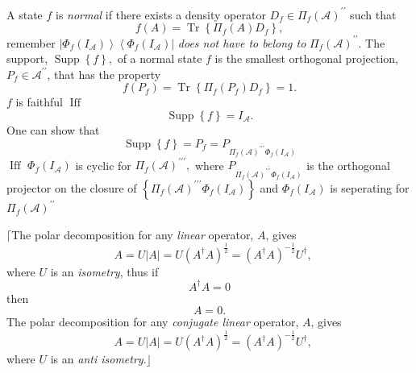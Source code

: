 \documentclass[aps,preprint]{revtex4}%
\begin{document}
A\emph{ }state $f$ is \emph{normal} if there exists a density operator
$D_{f}\in\Pi_{f}\left(  \mathcal{A}\right)  ^{\prime\prime}$ such that
\begin{equation}
f\left(  A\right)  =\operatorname{Tr}\left\{  \Pi_{f}\left(  A\right)
D_{f}\right\}  ,
\end{equation}
remember $\left\vert \Phi_{f}\left(  I_{\mathcal{A}}\right)  \right\rangle
\left\langle \Phi_{f}\left(  I_{\mathcal{A}}\right)  \right\vert $ \emph{does
not have to belong to} $\Pi_{f}\left(  \mathcal{A}\right)  ^{\prime\prime}.$
The support, $\operatorname{Supp}\left\{  f\right\}  ,$ of a normal state $f$
is the smallest orthogonal projection, $P_{f}\in\mathcal{A}^{\prime\prime}$,
that has the property
\begin{equation}
f\left(  P_{f}\right)  =\operatorname{Tr}\left\{  \Pi_{f}\left(  P_{f}\right)
D_{f}\right\}  =1.
\end{equation}
$f$ is faithful $\operatorname*{Iff}$
\begin{equation}
\operatorname{Supp}\left\{  f\right\}  =I_{\mathcal{A}}.
\end{equation}
One can show that
\begin{equation}
\operatorname{Supp}\left\{  f\right\}  =P_{f}=P_{\overline{\Pi_{f}\left(
\mathcal{A}\right)  ^{\prime\prime\prime}\Phi_{f}\left(  I_{\mathcal{A}%
}\right)  }}%
\end{equation}
$\operatorname*{Iff}$ $\Phi_{f}\left(  I_{\mathcal{A}}\right)  $ is cyclic for
$\Pi_{f}\left(  \mathcal{A}\right)  ^{\prime\prime\prime},$ where
$P_{\overline{\Pi_{f}\left(  \mathcal{A}\right)  ^{\prime\prime\prime}\Phi
_{f}\left(  I_{\mathcal{A}}\right)  }}$ is the orthogonal projector on the
closure of $\left\{  \Pi_{f}\left(  \mathcal{A}\right)  ^{\prime\prime\prime
}\Phi_{f}\left(  I_{\mathcal{A}}\right)  \right\}  $ and $\Phi_{f}\left(
I_{\mathcal{A}}\right)  $ is seperating for $\Pi_{f}\left(  \mathcal{A}%
\right)  ^{\prime\prime}$

$\lceil$The polar decomposition for any \emph{linear} operator, $A$, gives
\begin{equation}
\text{ }A=U\left\vert A\right\vert =U\left(  A^{\dagger}A\right)  ^{\frac
{1}{2}}=\left(  A^{\dagger}A\right)  ^{-\frac{1}{2}}U^{\dagger},
\end{equation}
where $U$ is an \emph{isometry}, thus if
\begin{equation}
A^{\dagger}A=0
\end{equation}
then
\begin{equation}
A=0.
\end{equation}
The polar decomposition for any \emph{conjugate linear} operator, $A$, gives
\begin{equation}
\text{ }A=U\left\vert A\right\vert =U\left(  A^{\dagger}A\right)  ^{\frac
{1}{2}}=\left(  A^{\dagger}A\right)  ^{-\frac{1}{2}}U^{\dagger},
\end{equation}
where $U$ is an \emph{anti isometry}.$\rfloor$
\end{document}
